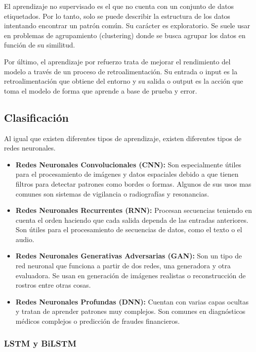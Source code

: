 El aprendizaje no supervisado es el que no cuenta con un conjunto de datos etiquetados. 
Por lo tanto, solo se puede describir la estructura de los datos intentando encontrar un patrón común. Su carácter es exploratorio.
Se suele usar en problemas de agrupamiento (clustering) donde se busca agrupar los datos en función de su similitud.

Por último, el aprendizaje por refuerzo trata de mejorar el rendimiento del modelo a través de un proceso de retroalimentación.
Su entrada o input es la retroalimentación que obtiene del entorno y su salida o output es la acción que toma el modelo de forma que aprende a base de prueba y error. \cite{aprendizajes}

\subsection{Clasificación}

Al igual que existen diferentes tipos de aprendizaje, existen diferentes tipos de redes neuronales.

\begin{itemize}
	\item \textbf{Redes Neuronales Convolucionales (CNN):} Son especialmente útiles para el procesamiento de imágenes y datos espaciales debido a que tienen filtros para detectar patrones como bordes o formas. Algunos de sus usos mas comunes son sistemas de vigilancia o radiografías y resonancias.
	\item \textbf{Redes Neuronales Recurrentes (RNN):} Procesan secuencias teniendo en cuenta el orden haciendo que cada salida dependa de las entradas anteriores. Son útiles para el procesamiento de secuencias de datos, como el texto o el audio.\cite{ibm:rnn}
	\item \textbf{Redes Neuronales Generativas Adversarias (GAN):} Son un tipo de red neuronal que funciona a partir de dos redes, una generadora y otra evaluadora. Se usan en generación de imágenes realistas o reconstrucción de rostros entre otras cosas.
	\item \textbf{Redes Neuronales Profundas (DNN):} Cuentan con varias capas ocultas y tratan de aprender patrones muy complejos. Son comunes en diagnósticos médicos complejos o predicción de fraudes financieros.
\end{itemize}

\subsubsection{LSTM y BiLSTM}


